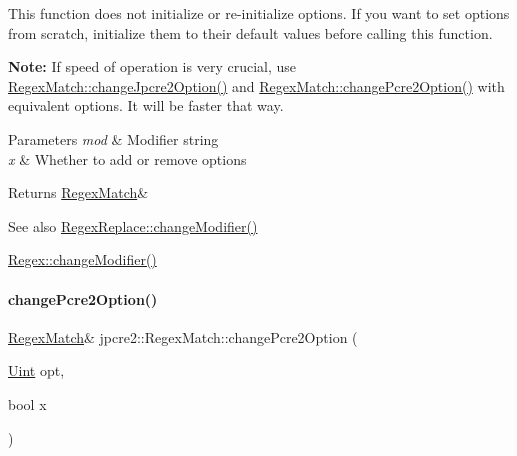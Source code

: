 This function does not initialize or re-\/initialize options. If you want to set options from scratch, initialize them to their default values before calling this function.

{\bfseries Note\+:} If speed of operation is very crucial, use \hyperlink{classjpcre2_1_1RegexMatch_a154430c66b8794d6632be6211a3ce870_a154430c66b8794d6632be6211a3ce870}{Regex\+Match\+::change\+Jpcre2\+Option()} and \hyperlink{classjpcre2_1_1RegexMatch_a6893abc21b24a9d9fca146a33c0f823c_a6893abc21b24a9d9fca146a33c0f823c}{Regex\+Match\+::change\+Pcre2\+Option()} with equivalent options. It will be faster that way. 
\begin{DoxyParams}{Parameters}
{\em mod} & Modifier string \\
\hline
{\em x} & Whether to add or remove options \\
\hline
\end{DoxyParams}
\begin{DoxyReturn}{Returns}
\hyperlink{classjpcre2_1_1RegexMatch}{Regex\+Match}\& 
\end{DoxyReturn}
\begin{DoxySeeAlso}{See also}
\hyperlink{classjpcre2_1_1RegexReplace_a0a2dc39fc28e6f7fe0a5d638f5891bdb_a0a2dc39fc28e6f7fe0a5d638f5891bdb}{Regex\+Replace\+::change\+Modifier()} 

\hyperlink{classjpcre2_1_1Regex_a9ab3efed9819a51225456e6d8487de56_a9ab3efed9819a51225456e6d8487de56}{Regex\+::change\+Modifier()} 
\end{DoxySeeAlso}
\hypertarget{classjpcre2_1_1RegexMatch_a6893abc21b24a9d9fca146a33c0f823c_a6893abc21b24a9d9fca146a33c0f823c}{}\label{classjpcre2_1_1RegexMatch_a6893abc21b24a9d9fca146a33c0f823c_a6893abc21b24a9d9fca146a33c0f823c} 
\paragraph{\texorpdfstring{change\+Pcre2\+Option()}{changePcre2Option()}}
{\footnotesize\ttfamily \hyperlink{classjpcre2_1_1RegexMatch}{Regex\+Match}\& jpcre2\+::\+Regex\+Match\+::change\+Pcre2\+Option (\begin{DoxyParamCaption}\item[{\hyperlink{namespacejpcre2_a078242d38221a13fb3543b9edd78c099}{Uint}}]{opt,  }\item[{bool}]{x }\end{DoxyParamCaption})\hspace{0.3cm}{\ttfamily [inline]}}



